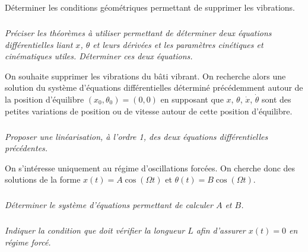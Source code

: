 \documentclass[10pt,fleqn]{article} %
\begin{document}
\begin{multicols}{2}
\begin{obj}
Déterminer les conditions géométriques permettant de supprimer les vibrations.
\end{obj}


\subparagraph{}
\textit{Préciser les théorèmes à utiliser permettant de déterminer deux équations différentielles liant $x$, $\theta$ et leurs dérivées et les paramètres cinétiques et cinématiques utiles. Déterminer ces deux équations.}
\ifprof
\begin{corrige}
\end{corrige}
\else
\fi

On souhaite supprimer les vibrations du bâti vibrant. On recherche alors une solution du système d’équations différentielles
déterminé précédemment autour de la position d’équilibre $\left(x_0,\theta_0\right)=(0,0)$ en supposant que $x$, $\theta$, $\dot{x}$, $\dot{\theta}$ sont des petites variations
de position ou de vitesse autour de cette position d’équilibre.


\subparagraph{}
\textit{Proposer une linéarisation, à l’ordre 1, des deux équations différentielles précédentes.}
\ifprof
\begin{corrige}
\end{corrige}
\else
\fi

On s’intéresse uniquement au régime d’oscillations forcées. On cherche donc des solutions de la forme $x(t)=A\cos\left( \Omega t \right)$ et $\theta(t)=B\cos\left( \Omega t \right)$.


\subparagraph{}
\textit{Déterminer le système d’équations permettant de calculer $A$ et $B$.}
\ifprof
\begin{corrige}
\end{corrige}
\else
\fi



\subparagraph{}
\textit{Indiquer la condition que doit vérifier la longueur $L$ afin d’assurer $x(t) = 0$ en régime forcé.}
\ifprof
\begin{corrige}
\end{corrige}
\else
\fi



\vspace{1cm}

\end{multicols}
\end{document}
